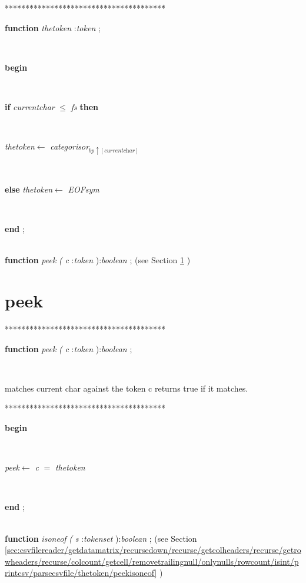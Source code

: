 \begin{tabbing}
***\=***\=***\=***\=***\=***\=***\=***\=***\=***\=***\=***\=***\=\kill
\parbox{14cm}{\textsf{\textbf{function}  \textit{thetoken} :\textit{token} ;}}\\
\+\parbox{14cm}{\textsf{\textbf{begin} }}\\
\+\parbox{14cm}{\textsf {\textbf {if } \textsf{\textit{currentchar} $\leq$ \textit{fs}} \textbf{ then } }}\\
\parbox{14cm}{\textsf{\textit{thetoken}$\leftarrow$ \textit{categorisor}$_{\textit{bp}\uparrow\textit{}[\textit{currentchar}]}$}}\\
\<\parbox{14cm}{\textsf {\textbf {else } \textsf{\textit{thetoken}$\leftarrow$ \textit{EOFsym}}}}\\
\<\-\<\-\parbox{14cm}{\textsf{\textbf{end} ;}}\\
\+\textsf{\textbf{function}  \textit{peek} \textit{(} \textit{c} :\textit{token} ):\textit{boolean} ;} (see Section \ref{sec:csvfilereader/getdatamatrix/recursedown/recurse/getcolheaders/recurse/getrowheaders/recurse/colcount/getcell/removetrailingnull/onlynulls/rowcount/isint/printcsv/parsecsvfile/thetokenpeek} )\\
\end{tabbing}
\section{peek}\label{sec:csvfilereader/getdatamatrix/recursedown/recurse/getcolheaders/recurse/getrowheaders/recurse/colcount/getcell/removetrailingnull/onlynulls/rowcount/isint/printcsv/parsecsvfile/thetokenpeek}

\begin{tabbing}
***\=***\=***\=***\=***\=***\=***\=***\=***\=***\=***\=***\=***\=\kill
\parbox{14cm}{\textsf{\textbf{function}  \textit{peek} \textit{(} \textit{c} :\textit{token} ):\textit{boolean} ;}}\\
\end{tabbing}
matches current char against the token c returns true if it matches.
\begin{tabbing}
***\=***\=***\=***\=***\=***\=***\=***\=***\=***\=***\=***\=***\=\kill
\\
\+\parbox{14cm}{\textsf{\textbf{begin} }}\\
\parbox{14cm}{\textsf{\textit{peek}$\leftarrow$ \textit{c} $=$ \textit{thetoken}}}\\
\<\-\parbox{14cm}{\textsf{\textbf{end} ;}}\\
\+\textsf{\textbf{function}  \textit{isoneof}  \textit{(} \textit{s} :\textit{tokenset} ):\textit{boolean} ;} (see Section \ref{sec:csvfilereader/getdatamatrix/recursedown/recurse/getcolheaders/recurse/getrowheaders/recurse/colcount/getcell/removetrailingnull/onlynulls/rowcount/isint/printcsv/parsecsvfile/thetoken/peekisoneof} )\\
\end{tabbing}
